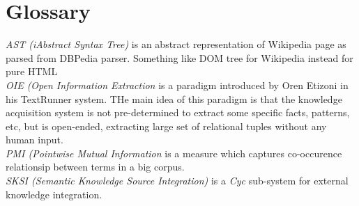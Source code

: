 % 
\chapter{Glossary}

\emph{AST (iAbstract Syntax Tree)} is an abstract representation of Wikipedia 
page as parsed from DBPedia parser. Something like DOM tree for Wikipedia 
instead for pure HTML\\
\emph{OIE (Open Information Extraction} is a paradigm introduced by Oren Etizoni in his TextRunner system. THe main idea of this paradigm is that the knowledge acquisition system is not pre-determined to extract some specific facts, patterns, etc, but is open-ended, extracting large set of relational tuples without any human input.\\
\emph{PMI (Pointwise Mutual Information} is a measure which captures 
co-occurence relationsip between terms in a big corpus.\\
\emph{SKSI (Semantic Knowledge Source Integration)} is a \emph{Cyc} sub-system
for external knowledge integration.\\
